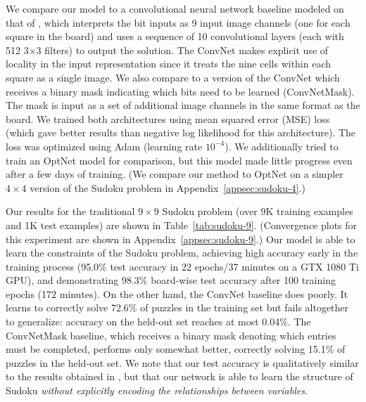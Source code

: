 \documentclass{article}
\begin{document}
	We compare our model to a convolutional neural network baseline modeled on that of \citet{park2016can}, which interprets the bit inputs as 9 input image channels (one for each square in the board) and uses a sequence of 10 convolutional layers (each with 512 3$\times$3 filters) to output the solution. The ConvNet makes explicit use of locality in the input representation since it treats the nine cells within each square as a single image. We also compare to a version of the ConvNet which receives a binary mask indicating which bits need to be learned (ConvNetMask). The mask is input as a set of additional image channels in the same format as the board. We trained both architectures using mean squared error (MSE) loss (which gave better results than negative log likelihood for this architecture). 
	The loss was optimized using Adam (learning rate $10^{-4}$).  
	We additionally tried to train an OptNet \cite{amos2017optnet} model for comparison, but this model made little progress even after a few days of training.
	(We compare our method to OptNet on a simpler $4 \times 4$ version of the Sudoku problem in Appendix~\ref{appsec:sudoku-4}.)
	
	Our results for the traditional $9 \times 9$ Sudoku problem (over 9K training examples and 1K test examples) are shown in Table~\ref{tab:sudoku-9}. (Convergence plots for this experiment are shown in Appendix~\ref{appsec:sudoku-9}.)
	Our model is able to 
learn the constraints of the Sudoku problem, achieving high accuracy early in the training process (95.0\% test accuracy in 22 epochs/37 minutes on a GTX 1080 Ti GPU), and demonstrating 98.3\% board-wise test accuracy after 100 training epochs (172 minutes).
On the other hand, the ConvNet baseline does poorly. It learns to correctly solve 72.6\% of puzzles in the training set but fails altogether to generalize: accuracy on the held-out set reaches at most 0.04\%. The ConvNetMask baseline, which receives a binary mask denoting which entries must be completed, performs only somewhat better, correctly solving 15.1\% of puzzles in the held-out set. 
	We note that our test accuracy is qualitatively similar to the results obtained in \citet{palm2017recurrent}, but that our network is able to learn the structure of Sudoku \emph{without explicitly encoding the relationships between variables}.
	
\end{document}
